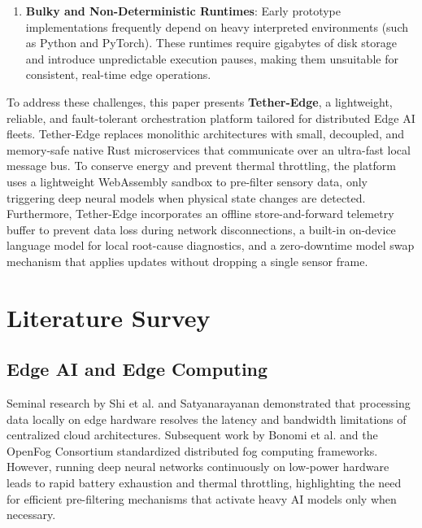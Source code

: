 \documentclass[conference]{IEEEtran}
\begin{document}
\begin{enumerate}
        services. This introduces several seconds of operational downtime, during which cameras stop analyzing data and critical defects or safety violations can
        pass unnoticed.
        \item \textbf{Bulky and Non-Deterministic Runtimes}: Early prototype implementations frequently depend on heavy interpreted environments (such as Python
        and PyTorch). These runtimes require gigabytes of disk storage and introduce unpredictable execution pauses, making them unsuitable for consistent, 
        real-time edge operations.
    \end{enumerate}

    To address these challenges, this paper presents \textbf{Tether-Edge}, a lightweight, reliable, and fault-tolerant orchestration platform tailored for
    distributed Edge AI fleets. Tether-Edge replaces monolithic architectures with small, decoupled, and memory-safe native Rust microservices that communicate
    over an ultra-fast local message bus. To conserve energy and prevent thermal throttling, the platform uses a lightweight WebAssembly sandbox to pre-filter
    sensory data, only triggering deep neural models when physical state changes are detected. Furthermore, Tether-Edge incorporates an offline store-and-forward
    telemetry buffer to prevent data loss during network disconnections, a built-in on-device language model for local root-cause diagnostics, and a zero-downtime
    model swap mechanism that applies updates without dropping a single sensor frame.

    \section{Literature Survey}

    \subsection{Edge AI and Edge Computing}
    Seminal research by Shi et al. \cite{b1} and Satyanarayanan \cite{b4} demonstrated that processing data locally on edge hardware resolves the latency and
    bandwidth limitations of centralized cloud architectures. Subsequent work by Bonomi et al. \cite{b2} and the OpenFog Consortium \cite{b3} standardized
    distributed fog computing frameworks. However, running deep neural networks continuously on low-power hardware leads to rapid battery exhaustion and thermal
    throttling, highlighting the need for efficient pre-filtering mechanisms that activate heavy AI models only when necessary.
\end{document}
